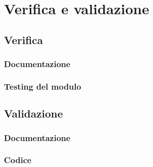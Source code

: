
\chapter{Verifica e validazione}
\label{cap:verifica-validazione}

\section{Verifica}

\subsection{Documentazione}

\subsection{Testing del modulo}

\section{Validazione}

\subsection{Documentazione}

\subsection{Codice}

